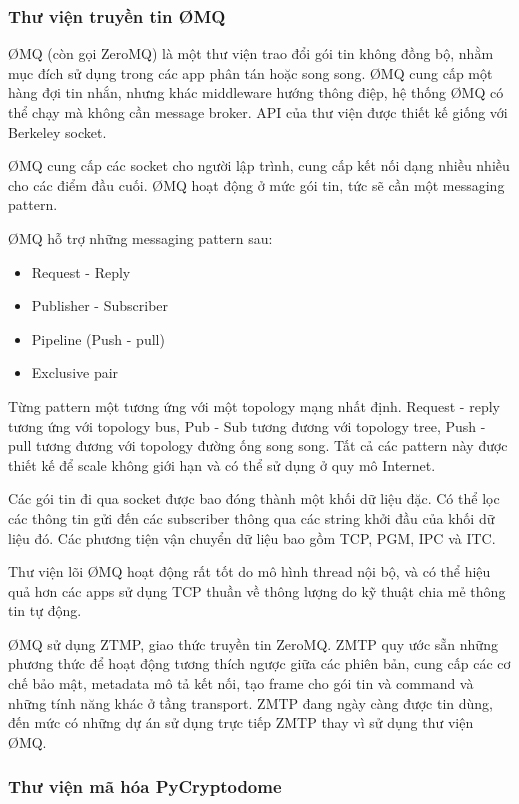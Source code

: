 \documentclass{article}
\begin{document}
\subsubsection{Thư viện truyền tin \O MQ}
\O MQ (còn gọi ZeroMQ) là một thư viện trao đổi gói tin không đồng bộ, nhằm mục đích sử dụng trong các app phân tán hoặc song song. \O MQ cung cấp một hàng đợi tin nhắn, nhưng khác middleware hướng thông điệp,  hệ thống \O MQ có thể chạy mà không cần message broker. API của thư viện được thiết kế giống với Berkeley socket. 

\O MQ cung cấp các socket cho người lập trình, cung cấp kết nối dạng nhiều nhiều cho các điểm đầu cuối. \O MQ hoạt động ở mức gói tin, tức sẽ cần một messaging pattern. 

\O MQ hỗ trợ những messaging pattern sau:
\begin{itemize}
    \item Request - Reply
    \item Publisher - Subscriber
    \item Pipeline (Push - pull)
    \item Exclusive pair
\end{itemize}

Từng pattern một tương ứng với một topology mạng nhất định. Request - reply tương ứng với topology bus, Pub - Sub tương đương với topology tree, Push - pull tương đương với topology đường ống song song. Tất cả các pattern này được thiết kế để scale không giới hạn và có thể sử dụng ở quy mô Internet.

Các gói tin đi qua socket được bao đóng thành một khối dữ liệu đặc. Có thể lọc các thông tin gửi đến các subscriber thông qua các string khởi đầu của khối dữ liệu đó. Các phương tiện vận chuyển dữ liệu bao gồm TCP, PGM, IPC và ITC.

Thư viện lõi \O MQ hoạt động rất tốt do mô hình thread nội bộ, và có thể hiệu quả hơn các apps sử dụng TCP thuần về thông lượng do kỹ thuật chia mẻ thông tin tự động.


\O MQ sử dụng ZTMP, giao thức truyền tin ZeroMQ. ZMTP quy ước sẵn những phương thức để hoạt động tương thích ngược giữa các phiên bản, cung cấp các cơ chế bảo mật, metadata mô tả kết nối, tạo frame cho gói tin và command và những tính năng khác ở tầng transport. ZMTP đang ngày càng được tin dùng, đến mức có những dự án sử dụng trực tiếp ZMTP thay vì sử dụng thư viện \O MQ.

\subsubsection{Thư viện mã hóa PyCryptodome}
\end{document}

